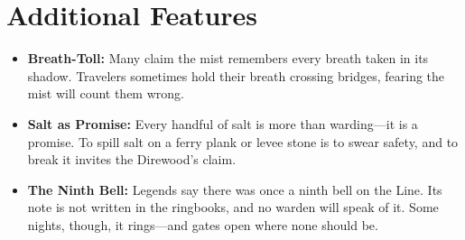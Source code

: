 \section*{Additional Features}
\begin{itemize}
\item \textbf{Breath-Toll:} Many claim the mist remembers every breath taken in its shadow. Travelers sometimes hold their breath crossing bridges, fearing the mist will count them wrong.
\item \textbf{Salt as Promise:} Every handful of salt is more than warding---it is a promise. To spill salt on a ferry plank or levee stone is to swear safety, and to break it invites the Direwood’s claim.
\item \textbf{The Ninth Bell:} Legends say there was once a ninth bell on the Line. Its note is not written in the ringbooks, and no warden will speak of it. Some nights, though, it rings---and gates open where none should be.
\end{itemize}

